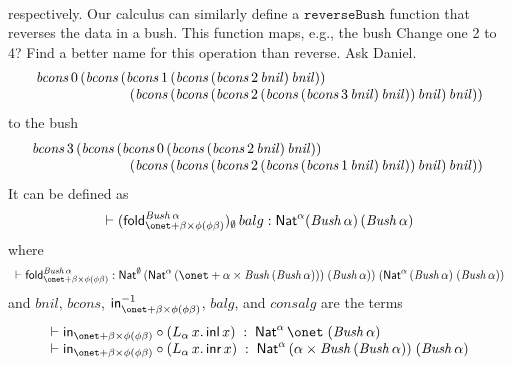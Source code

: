 \documentclass{lmcs}
\theoremstyle{plain}\newtheorem{satz}[thm]{Satz}
\newcommand{\inl}{\mathsf{inl}}
\newcommand{\inr}{\mathsf{inr}}
\newcommand{\fold}{\mathsf{fold}}
\begin{document}
{\[\begin{array}{l}
\end{array}\]
respectively. Our calculus can similarly define a
$\mathtt{reverseBush}$ function that reverses the data in a bush. This
function maps, e.g., the bush {\color{red} Change one 2 to 4? Find a
  better name for this operation than reverse. Ask Daniel.}
\[\begin{array}{l}
\mathit{bcons}\,0 \,(\mathit{bcons}\, (\mathit{bcons}\, 1\,
(\mathit{bcons}\, (\mathit{bcons}\, 2\,\mathit{bnil}) \,
\mathit{bnil}))\\ \hspace*{0.93in}(\mathit{bcons}\, (\mathit{bcons}\,
(\mathit{bcons}\, 2 \, (\mathit{bcons}\, (\mathit{bcons}\, 3\,
\mathit{bnil})\,  \mathit{bnil}))\, \mathit{bnil})\, \mathit{bnil}))
\end{array}\]
to the bush
\[\begin{array}{c}
\hspace*{-1.64in}\mathit{bcons}\,3\, (\mathit{bcons}\, (\mathit{bcons}\, 0
\,(\mathit{bcons}\, (\mathit{bcons}\, 2 \, \mathit{bnil}) \,
\mathit{bnil}))\\ 
\hspace*{0.93in}(\mathit{bcons}\, (\mathit{bcons}\, (\mathit{bcons}\, 2
\,(\mathit{bcons}\, (\mathit{bcons}\, 1 \, \mathit{bnil}) \,
\mathit{bnil})) \, \mathit{bnil})\, \mathit{bnil})) 
\end{array}\]
It can be defined as
\[\vdash (\fold^{\mathit{Bush}\,\alpha}_{\onet + \beta \times \phi (\phi \beta)})_\emptyset\, balg
: \Nat^\alpha (\mathit{Bush}\,\alpha)\,(\mathit{Bush}\,\alpha)\]
where
\[\begin{array}{lll}
\vdash \fold_{\onet + \beta \times \phi
  (\phi\beta)}^{\mathit{Bush}\,\alpha} : \Nat^{\emptyset}\, (\Nat^{\alpha}\, 
(\onet + \alpha \times \mathit{Bush}\, (\mathit{Bush}\, \alpha))) \;
(\mathit{Bush}\,\alpha))\; (\Nat^{\alpha} \,(\mathit{Bush}\,\alpha) \;
(\mathit{Bush}\,\alpha))\\
\end{array}\]
and $\mathit{bnil}$, $\mathit{bcons}$, $\tin^{-1}_{\onet + \beta
  \times \phi (\phi\beta)}$, $\mathit{balg}$, and $\mathit{consalg}$
are the terms
\[\begin{array}{l}
\vdash \tin_{\onet + \beta \times \phi (\phi\beta)} \circ (
L_{\alpha}\, x.\, \inl\, x) \; : \; \Nat^{\alpha}\, \onet\;
(\mathit{Bush}\,\alpha)\\ 
\vdash \tin_{\onet + \beta \times \phi (\phi\beta)} \circ (
L_{\alpha}\, x.\, \inr\, x ) \; : \; \Nat^{\alpha}\, (\alpha \times
\mathit{Bush}\,(\mathit{Bush}\,\alpha))\; (\mathit{Bush}\,\alpha)\\[0.05in]

\end{array}\]}
\end{document}
